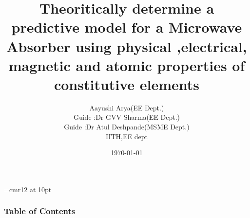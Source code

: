 \documentclass[11pt,aspect ratio=169]{beamer}
\begin{document}
	


	\font\myfont=cmr12 at 10pt
	  
	\title{ \myfont Theoritically determine a predictive model for a Microwave Absorber using  physical ,electrical, magnetic and atomic  properties of constitutive elements }
		\author{	\scriptsize Aayushi Arya(EE Dept.) \\
		\scriptsize	Guide :Dr GVV Sharma(EE Dept.) \\
			\scriptsize	Guide :Dr Atul Deshpande(MSME Dept.) \\
		\scriptsize	IITH,EE dept \\
	}



	\date[\tiny \today]{ \tiny \today}
	\begin{frame}[t]
		\maketitle
		
	\end{frame}
\begin{frame}
	\frametitle{Table of Contents}
	\tableofcontents
	\end{frame}
\end{document}
